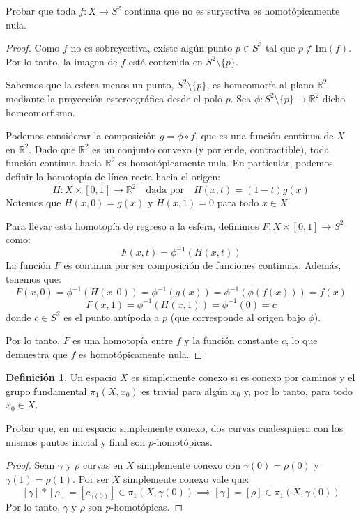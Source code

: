 \documentclass{article}
\theoremstyle{plain}
\theoremstyle{definition}
\newtheorem{definition}{Definición}[section]
\newcommand{\R}{\mathbb{R}}
\newenvironment{ejercicio}[1]{\begin{trivlist}
\item[\hskip \labelsep {\bfseries Ejercicio}\hskip \labelsep {\bfseries #1.}]}{\end{trivlist}}
\begin{document}
\begin{ejercicio}{2}
    Probar que toda \( f : X \rightarrow S^{2} \) continua que no es suryectiva es homotópicamente nula.
\end{ejercicio}
\begin{proof}
    Como \( f \) no es sobreyectiva, existe algún punto \( p \in S^{2} \) tal que \( p \notin \text{Im}(f) \). Por lo tanto, la imagen de \( f \) está contenida en \( S^{2} \setminus \{p\} \).

    Sabemos que la esfera menos un punto, \( S^{2} \setminus \{p\} \), es homeomorfa al plano \( \R^{2} \) mediante la proyección estereográfica desde el polo \( p \). Sea \( \phi : S^{2} \setminus \{p\} \rightarrow \R^{2} \) dicho homeomorfismo.

    Podemos considerar la composición \( g = \phi \circ f \), que es una función continua de \( X \) en \( \R^{2} \). Dado que \( \R^{2} \) es un conjunto convexo (y por ende, contractible), toda función continua hacia \( \R^{2} \) es homotópicamente nula.
    En particular, podemos definir la homotopía de línea recta hacia el origen:
    \[ H : X \times {[0 , 1]} \rightarrow \R^{2} \quad \text{dada por} \quad H(x,t) = (1-t)g(x) \]
    Notemos que \( H(x,0) = g(x) \) y \( H(x,1) = 0 \) para todo \( x \in X \).

    Para llevar esta homotopía de regreso a la esfera, definimos \( F : X \times [0,1] \rightarrow S^{2} \) como:
    \[ F(x,t) = \phi^{-1}(H(x,t)) \]
    La función \( F \) es continua por ser composición de funciones continuas. Además, tenemos que:
    \[ F(x,0) = \phi^{-1}(H(x,0)) = \phi^{-1}(g(x)) = \phi^{-1}(\phi(f(x))) = f(x) \]
    \[ F(x,1) = \phi^{-1}(H(x,1)) = \phi^{-1}(0) = c \]
    donde \( c \in S^{2} \) es el punto antípoda a \( p \) (que corresponde al origen bajo \( \phi \)).

    Por lo tanto, \( F \) es una homotopía entre \( f \) y la función constante \( c \), lo que demuestra que \( f \) es homotópicamente nula.
\end{proof}

\clearpage

\begin{definition}
    Un espacio \( X \) es simplemente conexo si es conexo por caminos y el grupo fundamental \( \pi_1(X, x_0) \) es trivial para algún \( x_0 \) y, por lo tanto, para todo \( x_0 \in X \).
\end{definition}

\begin{ejercicio}{3}
    Probar que, en un espacio simplemente conexo, dos curvas cualesquiera con los mismos puntos inicial y final son \( p \)-homotópicas.
\end{ejercicio}
\begin{proof}
    Sean \( \gamma \) y \( \rho \) curvas en \( X \) simplemente conexo con \( \gamma(0) = \rho(0) \) y \( \gamma(1) = \rho(1) \).
    Por ser \( X \) simplemente conexo vale que:
    \[
        [\gamma] \ast [\overline{\rho}] = [c_{\gamma(0)}] \in \pi_1(X, \gamma(0)) \implies [\gamma] = [\rho] \in \pi_1(X, \gamma(0))
    \]
    Por lo tanto, \( \gamma \) y \( \rho \) son \( p \)-homotópicas.
\end{proof}
\end{document}
